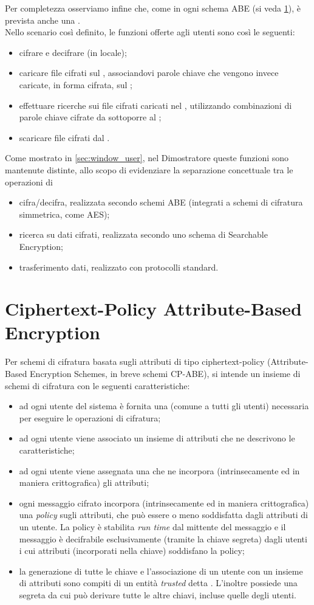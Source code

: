 \documentclass[a4paper,twoside,10pt,openany]{scrbook}
\begin{document}
Per completezza osserviamo infine che, come in ogni schema \ac{ABE} (si veda \ref{sec:cpabe}), è prevista anche una \emph{\abemk}.\\
%
Nello scenario così definito, le funzioni offerte agli utenti sono così le seguenti:
\begin{itemize}
 \item cifrare e decifrare (in locale);
 \item caricare file cifrati sul \sa, associandovi parole chiave che vengono invece caricate, in forma cifrata, sul \sr;
 \item effettuare ricerche sui file cifrati caricati nel \sa, utilizzando combinazioni di parole chiave cifrate da sottoporre al \sr;
 \item scaricare file cifrati dal \sa.
\end{itemize}
Come mostrato in \ref{sec:window_user}, nel Dimostratore queste funzioni sono mantenute distinte, allo scopo di evidenziare la separazione concettuale tra le operazioni di
\begin{itemize}
 \item cifra/decifra, realizzata secondo schemi \ac{ABE} (integrati a schemi di cifratura simmetrica, come AES);
 \item ricerca su dati cifrati, realizzata secondo uno schema di Searchable Encryption;
 \item trasferimento dati, realizzato con protocolli standard.
\end{itemize}
%
\section{Ciphertext-Policy Attribute-Based Encryption}\label{sec:cpabe}
Per schemi di cifratura basata sugli attributi di tipo ciphertext-policy (Attribute-Based Encryption Schemes, in breve schemi CP-ABE), si intende un insieme di schemi di cifratura con le seguenti caratteristiche:
\begin{itemize}
 \item ad ogni utente del sistema è fornita una \abepk (comune a tutti gli utenti) necessaria per eseguire le operazioni di cifratura;
 \item ad ogni utente viene associato un insieme di attributi che ne descrivono le caratteristiche;
 \item ad ogni utente viene assegnata una \abesk che ne incorpora (intrinsecamente ed in maniera crittografica) gli attributi;
 \item ogni messaggio cifrato incorpora (intrinsecamente ed in maniera crittografica) una \textit{policy} sugli attributi, che può essere o meno soddisfatta dagli attributi di un utente. La policy è stabilita \textit{run time} dal mittente del messaggio e il messaggio è decifrabile esclusivamente (tramite la chiave segreta) dagli utenti i cui attributi (incorporati nella chiave) soddisfano la policy;
 \item la generazione di tutte le chiave e l'associazione di un utente con un insieme di attributi sono compiti di un entità \textit{trusted} detta \auth. L'\auth inoltre possiede una \abemk segreta da cui può derivare tutte le altre chiavi, incluse quelle degli utenti.
\end{itemize}
%
\end{document}

